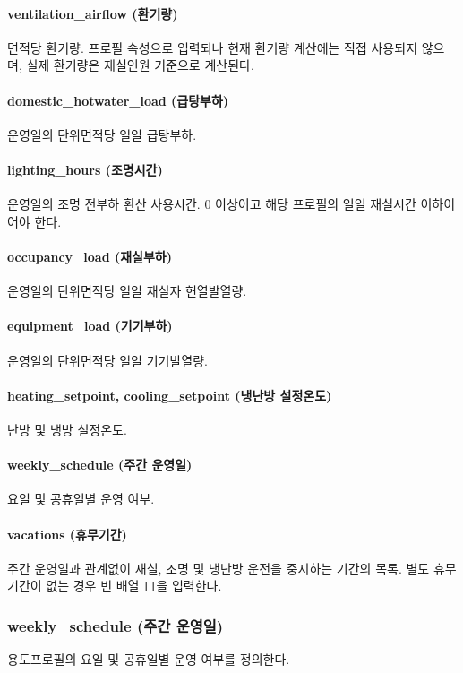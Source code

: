 \paragraph{ventilation\_airflow (환기량)} 면적당 환기량. 프로필 속성으로 입력되나 현재 환기량 계산에는 직접 사용되지 않으며, 실제 환기량은 재실인원 기준으로 계산된다.

\paragraph{domestic\_hotwater\_load (급탕부하)} 운영일의 단위면적당 일일 급탕부하.

\paragraph{lighting\_hours (조명시간)} 운영일의 조명 전부하 환산 사용시간. 0 이상이고 해당 프로필의 일일 재실시간 이하이어야 한다.

\paragraph{occupancy\_load (재실부하)} 운영일의 단위면적당 일일 재실자 현열발열량.

\paragraph{equipment\_load (기기부하)} 운영일의 단위면적당 일일 기기발열량.

\paragraph{heating\_setpoint, cooling\_setpoint (냉난방 설정온도)} 난방 및 냉방 설정온도.

\paragraph{weekly\_schedule (주간 운영일)} 요일 및 공휴일별 운영 여부.

\paragraph{vacations (휴무기간)} 주간 운영일과 관계없이 재실, 조명 및 냉난방 운전을 중지하는 기간의 목록. 별도 휴무기간이 없는 경우 빈 배열 \texttt{[]}을 입력한다.

\subsubsection{weekly\_schedule (주간 운영일)} \label{subsubsection:ioref:weeklyschedule}
용도프로필의 요일 및 공휴일별 운영 여부를 정의한다.

